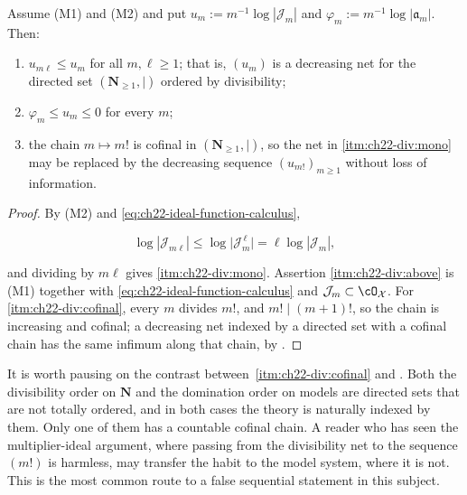 \begin{lemma}
\label{lem:ch22-divisibility-net}
Assume \textup{(M1)} and \textup{(M2)} and put
$u_m:=m^{-1}\log|\mathcal J_m|$ and
$\varphi_m:=m^{-1}\log|\mathfrak a_m|$.  Then:
\begin{enumerate}
\item\label{itm:ch22-div:mono} $u_{m\ell}\leq u_m$ for all
$m,\ell\geq1$; that is, $(u_m)$ is a decreasing net for the directed set
$(\mathbf N_{\geq1},\mid)$ ordered by divisibility;
\item\label{itm:ch22-div:above} $\varphi_m\leq u_m\leq0$ for every $m$;
\item\label{itm:ch22-div:cofinal} the chain $m\mapsto m!$ is cofinal in
$(\mathbf N_{\geq1},\mid)$, so the net in
\cref{itm:ch22-div:mono} may be replaced by the decreasing sequence
$(u_{m!})_{m\geq1}$ without loss of information.
\end{enumerate}
\end{lemma}

\begin{proof}
By (M2) and \eqref{eq:ch22-ideal-function-calculus},

\[
 \log|\mathcal J_{m\ell}|\leq\log\bigl|\mathcal J_m^{\,\ell}\bigr|
 =\ell\log|\mathcal J_m| ,
\]

and dividing by $m\ell$ gives \cref{itm:ch22-div:mono}.  Assertion
\cref{itm:ch22-div:above} is (M1) together with
\eqref{eq:ch22-ideal-function-calculus} and
$\mathcal J_m\subset\cO_{\mathcal X}$.  For
\cref{itm:ch22-div:cofinal}, every $m$ divides $m!$, and
$m!\mid(m+1)!$, so the chain is increasing and cofinal; a decreasing net
indexed by a directed set with a cofinal chain has the same infimum along
that chain, by .
\end{proof}

\begin{remark}
\label{rem:ch22-two-directed-sets}
It is worth pausing on the contrast between
\,\cref{itm:ch22-div:cofinal} and
.  Both the divisibility order on
$\mathbf N$ and the domination order on models are directed sets that are
not totally ordered, and in both cases the theory is naturally indexed by
them.  Only one of them has a countable cofinal chain.  A reader who has
seen the multiplier-ideal argument, where passing from the divisibility net
to the sequence $(m!)$ is harmless, may transfer the habit to the model
system, where it is not.  This is the most common route to a false
sequential statement in this subject.
\end{remark}

